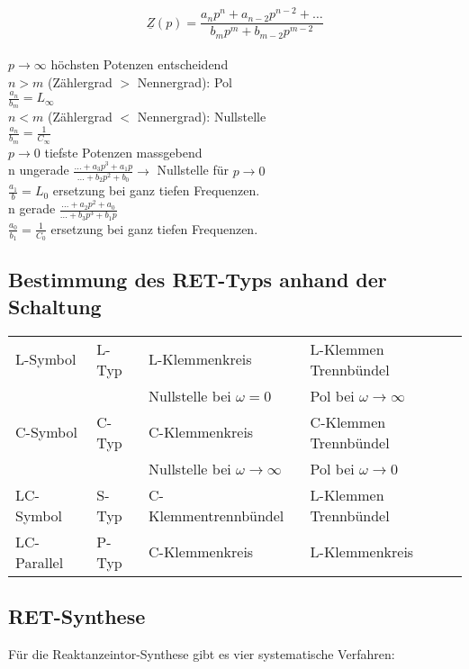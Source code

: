 $$\underline{Z}(p)=\frac{a_np^n+a_{n-2}p^{n-2}+\ldots}{b_mp^m+b_{m-2}p^{m-2}}$$\\
$p\rightarrow \infty$ höchsten Potenzen entscheidend\\
\hspace*{5pt}$n>m$ (Zählergrad $>$ Nennergrad): Pol\\
\hspace*{10pt}$\frac{a_n}{b_m}=L_{\infty}$\\
\hspace*{5pt}$n<m$ (Zählergrad $<$ Nennergrad): Nullstelle\\
\hspace*{10pt}$\frac{a_n}{b_m}=\frac{1}{C_{\infty}}$\\
$p\rightarrow 0$ tiefste Potenzen massgebend\\
\hspace*{5pt}n ungerade
$\frac{\ldots+a_3p^3+a_1p}{\ldots+b_2p^2+b_0}\rightarrow$ Nullstelle für $p\rightarrow 0$\\
\hspace*{10pt}$\frac{a_1}{b} = L_0$ ersetzung bei ganz tiefen Frequenzen.\\
\hspace*{5pt}n gerade $\frac{\ldots+a_2p^2+a_0}{\ldots+b_3p^3+b_1p}$\\
\hspace*{10pt}$\frac{a_0}{b_1}=\frac{1}{C_0}$ ersetzung bei ganz tiefen
Frequenzen.\\


\subsection{Bestimmung des RET-Typs anhand der Schaltung}
\begin{tabular}{llll}
L-Symbol & L-Typ & L-Klemmenkreis & L-Klemmen Trennbündel\\
& & Nullstelle bei $\omega = 0$ & Pol bei $\omega \rightarrow \infty$ \\
C-Symbol & C-Typ & C-Klemmenkreis & C-Klemmen Trennbündel\\
& & Nullstelle bei $\omega \rightarrow \infty$ & Pol bei $\omega \rightarrow
0$\\
LC-Symbol & S-Typ & C-Klemmentrennbündel & L-Klemmen Trennbündel\\
LC-Parallel & P-Typ & C-Klemmenkreis & L-Klemmenkreis\\
\end{tabular}

\subsection{RET-Synthese}
Für die Reaktanzeintor-Synthese gibt es vier systematische Verfahren:

